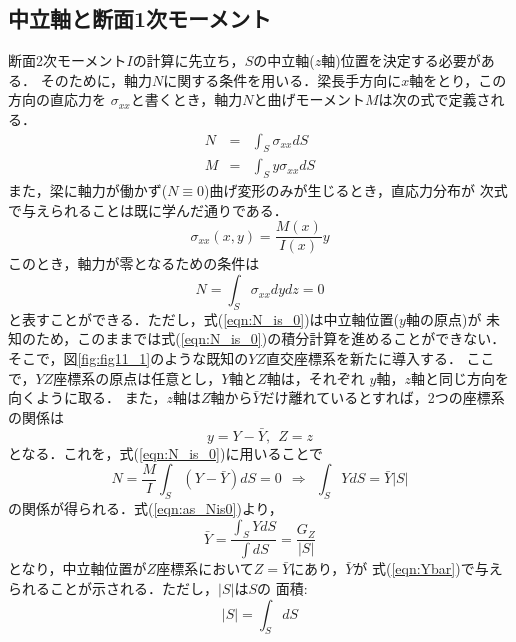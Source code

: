 \documentclass[10pt,a4j]{jarticle}
\begin{document}
\subsection{中立軸と断面1次モーメント}
断面2次モーメント$I$の計算に先立ち，$S$の中立軸($z$軸)位置を決定する必要がある．
そのために，軸力$N$に関する条件を用いる．梁長手方向に$x$軸をとり，この方向の直応力を
$\sigma_{xx}$と書くとき，軸力$N$と曲げモーメント$M$は次の式で定義される．
\begin{eqnarray}
	N &= & \int_S \sigma_{xx}dS 
	\label{eqn:def_N}
	\\
	M &= & \int_S y\sigma_{xx}dS 
	\label{eqn:def_M}
\end{eqnarray}
また，梁に軸力が働かず($N\equiv 0$)曲げ変形のみが生じるとき，直応力分布が
次式で与えられることは既に学んだ通りである．
\begin{equation}
	\sigma_{xx}(x,y)=\frac{M(x)}{I(x)}y
	\label{eqn:sig_xx}
\end{equation}
このとき，軸力が零となるための条件は
\begin{equation}
	N =  \int_S \sigma_{xx}dydz = 0 
	\label{eqn:N_is_0}
\end{equation}
と表すことができる．ただし，式(\ref{eqn:N_is_0})は中立軸位置($y$軸の原点)が
未知のため，このままでは式(\ref{eqn:N_is_0})の積分計算を進めることができない．
そこで，図\ref{fig:fig11_1}のような既知の$YZ$直交座標系を新たに導入する．
ここで，$YZ$座標系の原点は任意とし，$Y$軸と$Z$軸は，それぞれ
$y$軸，$z$軸と同じ方向を向くように取る．
また，$z$軸は$Z$軸から$\bar{Y}$だけ離れているとすれば，2つの座標系の関係は
\begin{equation}
	y=Y-\bar Y, \ \ Z=z
	\label{eqn:y_shift}
\end{equation}
となる．これを，式(\ref{eqn:N_is_0})に用いることで
\begin{equation}
	N=\frac{M}{I}\int_S \left(Y-\bar Y \right)dS=0 
	\ \ \Rightarrow \ \
	\int_S Y dS =\bar Y \left| S \right|
	\label{eqn:as_Nis0}
\end{equation}
の関係が得られる．式(\ref{eqn:as_Nis0})より，
\begin{equation}
	\bar Y
	= \frac{\int_S YdS }{\int dS}
	= \frac{G_Z}{\left| S \right|}
	\label{eqn:Ybar}
\end{equation}
となり，中立軸位置が$Z$座標系において$Z=\bar{Y}$にあり，$\bar{Y}$が
式(\ref{eqn:Ybar})で与えられることが示される．ただし，$\left| S\right|$は$S$の
面積:
\begin{equation}
	\left| S \right| = \int_S dS
	\label{eqn:area}
\end{equation}
\end{document}
